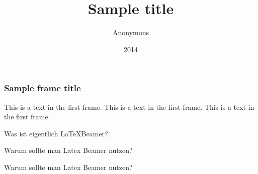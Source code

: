 \documentclass{beamer}
\title{Sample title}
\author{Anonymous}
\institute{Overleaf}
\date{2014}
\begin{document}
\frame{\titlepage}

\begin{frame}
\frametitle{Sample frame title}
This is a text in the first frame. This is a text in the first frame. This is a text in the first frame.
\end{frame}

\begin{frame}{Was ist eigentlich \LaTeX Beamer?}
\end{frame}

\begin{frame}{Warum sollte man Latex Beamer nutzen?}

\end{frame}

\begin{frame}{Warum sollte man Latex Beamer nutzen?}

\end{frame}
\end{document}
